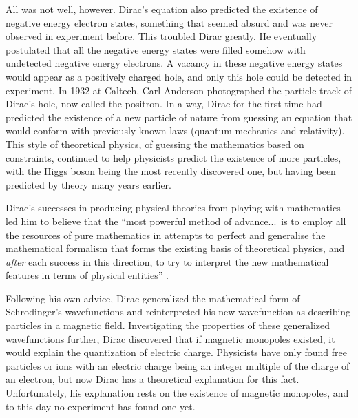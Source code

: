 \documentclass[12pt, oneside, letterpaper, fleqn]{article}
\begin{document}
All was not well, however. Dirac's equation also predicted the existence
of negative energy electron states, something that seemed absurd and was
never observed in experiment before. This troubled Dirac greatly. He
eventually postulated that all the negative energy states were filled
somehow with undetected negative energy electrons. A vacancy in these
negative energy states would appear as a positively charged hole, and
only this hole could be detected in experiment. In 1932 at Caltech, Carl
Anderson photographed the particle track of Dirac's hole, now called the
positron. In a way, Dirac for the first time had predicted the existence
of a new particle of nature from guessing an equation that would conform
with previously known laws (quantum mechanics and relativity). This
style of theoretical physics, of guessing the mathematics based on
constraints, continued to help physicists predict the existence of more
particles, with the Higgs boson being the most recently discovered one,
but having been predicted by theory many years earlier.

Dirac's successes in producing physical theories from playing with
mathematics led him to believe that the ``most powerful method of
advance...\ is to employ all the resources of pure mathematics in
attempts to perfect and generalise the mathematical formalism that forms
the existing basis of theoretical physics, and \emph{after} each success
in this direction, to try to interpret the new mathematical features in
terms of physical entities'' \cite{monopoles}.

Following his own advice, Dirac generalized the mathematical form of
Schrodinger's wavefunctions and reinterpreted his new wavefunction as
describing particles in a magnetic field. Investigating the properties
of these generalized wavefunctions further, Dirac discovered that if
magnetic monopoles existed, it would explain the quantization of
electric charge. Physicists have only found free particles or ions with
an electric charge being an integer multiple of the charge of an
electron, but now Dirac has a theoretical explanation for this fact.
Unfortunately, his explanation rests on the existence of magnetic
monopoles, and to this day no experiment has found one yet.



\nocite{*}
%


\end{document}
